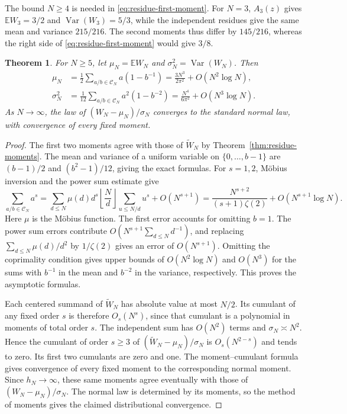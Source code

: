 \documentclass[11pt]{amsart}
\newtheorem{theorem}{Theorem}[section]
\theoremstyle{remark}
\begin{document}
The bound \(N\ge4\) is needed in \eqref{eq:residue-first-moment}.
For \(N=3\), \(A_3(z)\) gives \(\mathbb E W_3=3/2\) and
\(\operatorname{Var}(W_3)=5/3\), while the independent residues give
the same mean and variance \(215/216\). The second moments thus
differ by \(145/216\), whereas the right side of
\eqref{eq:residue-first-moment} would give \(3/8\).

\begin{theorem}\label{thm:residue-gaussian}
For $N\ge5$, let $\mu_N=\mathbb E W_N$ and $\sigma_N^2=\operatorname{Var}(W_N)$. Then
\begin{align*}
 \mu_N&=\frac12\sum_{a/b\in\mathcal C_N} a(1-b^{-1})
       =\frac{3N^3}{2\pi^2}+O(N^2\log N),\\
 \sigma_N^2&=\frac1{12}\sum_{a/b\in\mathcal C_N} a^2(1-b^{-2})
       =\frac{N^4}{6\pi^2}+O(N^3\log N).
\end{align*}
As $N\to\infty$, the law of $(W_N-\mu_N)/\sigma_N$ converges to the standard normal law, with convergence of every fixed moment.
\end{theorem}

\begin{proof}
The first two moments agree with those of $\widetilde W_N$ by Theorem~\ref{thm:residue-moments}. The mean and variance of a uniform variable on $\{0,\ldots,b-1\}$ are $(b-1)/2$ and $(b^2-1)/12$, giving the exact formulas. For $s=1,2$, M\"obius inversion and the power sum estimate give
\[
 \sum_{a/b\in\mathcal C_N} a^s
 =\sum_{d\le N}\mu(d)d^s\left\lfloor\frac Nd\right\rfloor
       \sum_{u\le N/d}u^s+O(N^{s+1})
 =\frac{N^{s+2}}{(s+1)\zeta(2)}+O(N^{s+1}\log N).
\]
Here $\mu$ is the M\"obius function. The first error accounts for omitting $b=1$. The power sum errors contribute $O(N^{s+1}\sum_{d\le N}d^{-1})$, and replacing $\sum_{d\le N}\mu(d)/d^2$ by $1/\zeta(2)$ gives an error of $O(N^{s+1})$. Omitting the coprimality condition gives upper bounds of $O(N^2\log N)$ and $O(N^3)$ for the sums with $b^{-1}$ in the mean and $b^{-2}$ in the variance, respectively. This proves the asymptotic formulas.

Each centered summand of $\widetilde W_N$ has absolute value at most $N/2$. Its cumulant of any fixed order $s$ is therefore $O_s(N^s)$, since that cumulant is a polynomial in moments of total order $s$. The independent sum has $O(N^2)$ terms and $\sigma_N\asymp N^2$. Hence the cumulant of order $s\ge3$ of $(\widetilde W_N-\mu_N)/\sigma_N$ is $O_s(N^{2-s})$ and tends to zero. Its first two cumulants are zero and one. The moment--cumulant formula gives convergence of every fixed moment to the corresponding normal moment. Since $h_N\to\infty$, these same moments agree eventually with those of $(W_N-\mu_N)/\sigma_N$. The normal law is determined by its moments, so the method of moments \cite{frechet-shohat} gives the claimed distributional convergence.
\end{proof}
\end{document}
